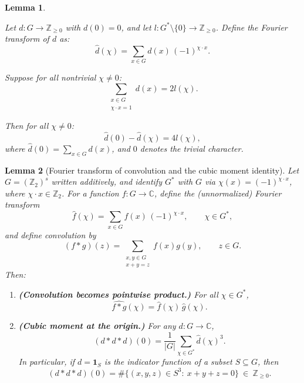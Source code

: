 \documentclass[10pt,a4paper]{amsart}
\newtheorem{lemma}{Lemma}
\begin{document}
\begin{lemma}\label{lemma: Fourier}


Let \( d: G \to \mathbb{Z}_{\ge 0} \) with \( d(0) = 0 \), and let \( l: G^* \setminus \{0\} \to \mathbb{Z}_{\ge 0} \). Define the Fourier transform of \( d \) as:
\[
\widehat{d}(\chi) = \sum_{x \in G} d(x) \, (-1)^{\chi \cdot x}.
\]

Suppose for all nontrivial \( \chi \neq 0 \):
\begin{equation}\label{l_chi}
\sum_{\substack{x \in G \\ \chi \cdot x = 1}} d(x) = 2 l(\chi). 
\end{equation}

Then for all \( \chi \neq 0 \):
\[
\widehat{d}(0) - \widehat{d}(\chi) = 4 l(\chi),
\]
where \( \widehat{d}(0) = \sum_{x \in G} d(x) \), and \( 0 \) denotes the trivial character.

\end{lemma}

\begin{lemma}[Fourier transform of convolution and the cubic moment identity]\label{lem:fourier-convolution-cubic}
Let $G=(\mathbb Z_2)^s$ written additively, and identify $G^*$ with $G$ via
$\chi(x)=(-1)^{\chi\cdot x}$, where $\chi\cdot x\in\mathbb Z_2$.
For a function $f:G\to\mathbb C$, define the (unnormalized) Fourier transform
\[
\widehat f(\chi)=\sum_{x\in G} f(x)\,(-1)^{\chi\cdot x},\qquad \chi\in G^*,
\]
and define convolution by
\[
(f*g)(z)=\sum_{\substack{x,y\in G\\ x+y=z}} f(x)g(y),\qquad z\in G.
\]
Then:
\begin{enumerate}
\item \textbf{(Convolution becomes pointwise product.)} For all $\chi\in G^*$,
\[
\widehat{f*g}(\chi)=\widehat f(\chi)\,\widehat g(\chi).
\]
\item \textbf{(Cubic moment at the origin.)} For any $d:G\to\mathbb C$,
\[
(d*d*d)(0)=\frac{1}{|G|}\sum_{\chi\in G^*}\widehat d(\chi)^3.
\]
In particular, if $d=\mathbf{1}_S$ is the indicator function of a subset $S\subseteq G$,
then
\[
(d*d*d)(0)=\#\{(x,y,z)\in S^3:\ x+y+z=0\}\ \in\ \mathbb Z_{\ge 0}.
\]
\end{enumerate}
\end{lemma}
\end{document}
